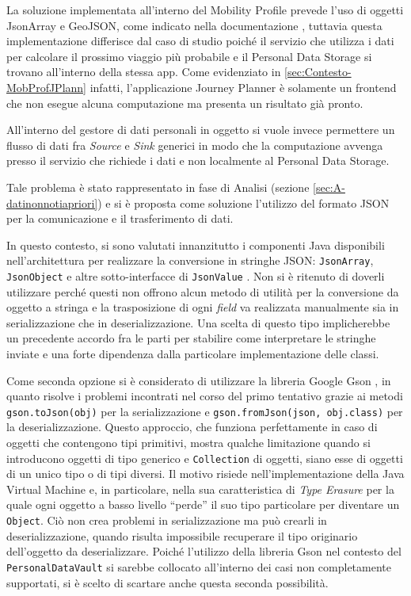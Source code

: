 La soluzione implementata all’interno del Mobility Profile prevede l’uso di oggetti JsonArray e GeoJSON, come indicato nella documentazione  \cite{githubmobilityprofilespecification}, tuttavia questa implementazione differisce dal caso di studio poich\'e il servizio che utilizza i dati per calcolare il prossimo viaggio pi\`u probabile e il Personal Data Storage si trovano all’interno della stessa app. Come evidenziato in \ref{sec:Contesto-MobProfJPlann} infatti, l’applicazione Journey Planner \`e solamente un frontend che non esegue alcuna computazione ma presenta un risultato gi\`a pronto.

All’interno del gestore di dati personali in oggetto si vuole invece permettere un flusso di dati fra \textit{Source} e \textit{Sink} generici in modo che la computazione avvenga presso il servizio che richiede i dati e non localmente al Personal Data Storage.

Tale problema \`e stato rappresentato in fase di Analisi (sezione \ref{sec:A-datinonnotiapriori}) e si \`e proposta come soluzione l’utilizzo del formato JSON per la comunicazione e il trasferimento di dati.

In questo contesto, si sono valutati innanzitutto i componenti Java disponibili nell’architettura per realizzare la conversione in stringhe JSON: \texttt{JsonArray}, \texttt{JsonObject} e altre sotto-interfacce di \texttt{JsonValue} \cite{java8api}. Non si \`e ritenuto di doverli utilizzare perch\'e questi non offrono alcun metodo di utilit\`a per la conversione da oggetto a stringa e la trasposizione di ogni \textit{field} va realizzata manualmente sia in serializzazione che in deserializzazione. Una scelta di questo tipo implicherebbe un precedente accordo fra le parti per stabilire come interpretare le stringhe inviate e una forte dipendenza dalla particolare implementazione delle classi.

Come seconda opzione si \`e considerato di utilizzare la libreria Google Gson \cite{googlegson}, in quanto risolve i problemi incontrati nel corso del primo tentativo grazie ai metodi \texttt{gson.toJson(obj)} per la serializzazione e \texttt{gson.fromJson\-(json,\- obj.class)} per la deserializzazione. Questo approccio, che funziona perfettamente in caso di oggetti che contengono tipi primitivi, mostra qualche limitazione quando si introducono oggetti di tipo generico e \texttt{Collection} di oggetti, siano esse di oggetti di un unico tipo o di tipi diversi. Il motivo risiede nell’implementazione della Java Virtual Machine e, in particolare, nella sua caratteristica di \textit{Type Erasure} per la quale ogni oggetto a basso livello “perde” il suo tipo particolare per diventare un \texttt{Object}. Ci\`o non crea problemi in serializzazione ma pu\`o crearli in deserializzazione, quando risulta impossibile recuperare il tipo originario dell’oggetto da deserializzare. Poich\'e l’utilizzo della libreria Gson nel contesto del \texttt{PersonalDataVault} si sarebbe collocato all’interno dei casi non completamente supportati, si \`e scelto di scartare anche questa seconda possibilit\`a.

